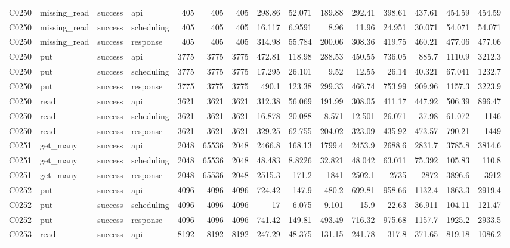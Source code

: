 \begin{landscape}
\begin{longtable}{llllrrrrrrrrrrr}
C0250 & missing\_\allowbreak{}read & success & api & 405 & 405 & 405 & 298.86 & 52.071 & 189.88 & 292.41 & 398.61 & 437.61 & 454.59 & 454.59\\
C0250 & missing\_\allowbreak{}read & success & scheduling & 405 & 405 & 405 & 16.117 & 6.9591 & 8.96 & 11.96 & 24.951 & 30.071 & 54.071 & 54.071\\
C0250 & missing\_\allowbreak{}read & success & response & 405 & 405 & 405 & 314.98 & 55.784 & 200.06 & 308.36 & 419.75 & 460.21 & 477.06 & 477.06\\
C0250 & put & success & api & 3775 & 3775 & 3775 & 472.81 & 118.98 & 288.53 & 450.55 & 736.05 & 885.7 & 1110.9 & 3212.3\\
C0250 & put & success & scheduling & 3775 & 3775 & 3775 & 17.295 & 26.101 & 9.52 & 12.55 & 26.14 & 40.321 & 67.041 & 1232.7\\
C0250 & put & success & response & 3775 & 3775 & 3775 & 490.1 & 123.38 & 299.33 & 466.74 & 753.99 & 909.96 & 1157.3 & 3223.9\\
C0250 & read & success & api & 3621 & 3621 & 3621 & 312.38 & 56.069 & 191.99 & 308.05 & 411.17 & 447.92 & 506.39 & 896.47\\
C0250 & read & success & scheduling & 3621 & 3621 & 3621 & 16.878 & 20.088 & 8.571 & 12.501 & 26.071 & 37.98 & 61.072 & 1146\\
C0250 & read & success & response & 3621 & 3621 & 3621 & 329.25 & 62.755 & 204.02 & 323.09 & 435.92 & 473.57 & 790.21 & 1449\\
C0251 & get\_\allowbreak{}many & success & api & 2048 & 65536 & 2048 & 2466.8 & 168.13 & 1799.4 & 2453.9 & 2688.6 & 2831.7 & 3785.8 & 3814.6\\
C0251 & get\_\allowbreak{}many & success & scheduling & 2048 & 65536 & 2048 & 48.483 & 8.8226 & 32.821 & 48.042 & 63.011 & 75.392 & 105.83 & 110.8\\
C0251 & get\_\allowbreak{}many & success & response & 2048 & 65536 & 2048 & 2515.3 & 171.2 & 1841 & 2502.1 & 2735 & 2872 & 3896.6 & 3912\\
C0252 & put & success & api & 4096 & 4096 & 4096 & 724.42 & 147.9 & 480.2 & 699.81 & 958.66 & 1132.4 & 1863.3 & 2919.4\\
C0252 & put & success & scheduling & 4096 & 4096 & 4096 & 17 & 6.075 & 9.101 & 15.9 & 22.63 & 36.911 & 104.11 & 121.47\\
C0252 & put & success & response & 4096 & 4096 & 4096 & 741.42 & 149.81 & 493.49 & 716.32 & 975.68 & 1157.7 & 1925.2 & 2933.5\\
C0253 & read & success & api & 8192 & 8192 & 8192 & 247.29 & 48.375 & 131.15 & 241.78 & 317.8 & 371.65 & 819.18 & 1086.2\\

\end{longtable}
\end{landscape}
